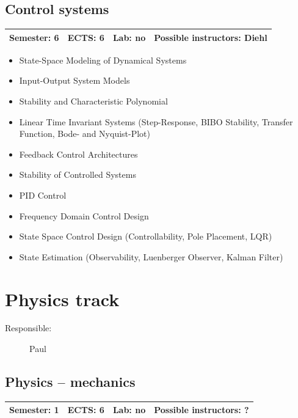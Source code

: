 \documentclass[12pt,twoside,fleqn,a4paper]{article}
\begin{document}
\subsection{Control systems}
\begin{tabular}{llll} \hline
\textbf{Semester:} 6 & \textbf{ECTS:} 6 & \textbf{Lab:} no & \textbf{Possible instructors:} Diehl\\
\hline
\end{tabular}

\begin{itemize}
\setlength\itemsep{0cm}
\item State-Space Modeling of Dynamical Systems
\item Input-Output System Models
\item Stability and Characteristic Polynomial
\item Linear Time Invariant Systems (Step-Response, BIBO Stability, Transfer Function, Bode- and Nyquist-Plot)
\item Feedback Control Architectures
\item Stability of Controlled Systems
\item PID Control
\item Frequency Domain Control Design
\item State Space Control Design (Controllability, Pole Placement, LQR)
\item State Estimation (Observability, Luenberger Observer, Kalman Filter)
\end{itemize}


\newpage
\section{Physics track}
\begin{description}
\item[Responsible:] Paul
\end{description}
\vspace{1 mm}


\subsection{Physics -- mechanics}
\begin{tabular}{llll} \hline
\textbf{Semester:} 1 & \textbf{ECTS:} 6 & \textbf{Lab:} no & \textbf{Possible instructors:} ?\\
\hline
\end{tabular}
\end{document}
